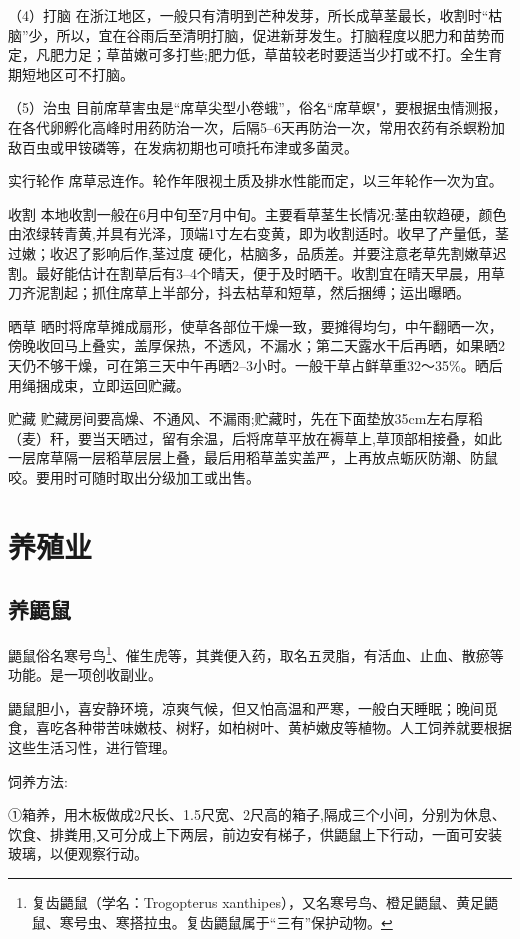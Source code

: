 \documentclass{ctexbook}
\begin{document}
（4）打脑 在浙江地区，一般只有清明到芒种发芽，所长成草茎最长，收割时“枯脑”少，所以，宜在谷雨后至清明打脑，促进新芽发生。打脑程度以肥力和苗势而定，凡肥力足；草苗嫩可多打些;肥力低，草苗较老时要适当少打或不打。全生育期短地区可不打脑。

（5）治虫 目前席草害虫是“席草尖型小卷蛾”，俗名“席草螟"，要根据虫情测报，在各代卵孵化高峰时用药防治一次，后隔5--6天再防治一次，常用农药有杀螟粉加敌百虫或甲铵磷等，在发病初期也可喷托布津或多菌灵。

实行轮作 席草忌连作。轮作年限视土质及排水性能而定，以三年轮作一次为宜。

收割 本地收割一般在6月中旬至7月中旬。主要看草茎生长情况:茎由软趋硬，颜色由浓绿转青黄,并具有光泽，顶端1寸左右变黄，即为收割适时。收早了产量低，茎过嫩；收迟了影响后作,茎过度
硬化，枯脑多，品质差。并要注意老草先割嫩草迟割。最好能估计在割草后有3--4个晴天，便于及时晒干。收割宜在晴天早晨，用草刀齐泥割起；抓住席草上半部分，抖去枯草和短草，然后捆缚；运出曝晒。

晒草 晒时将席草摊成扇形，使草各部位干燥一致，要摊得均匀，中午翻晒一次，傍晚收回马上叠实，盖厚保热，不透风，不漏水；第二天露水干后再晒，如果晒2天仍不够干燥，可在第三天中午再晒2--3小时。一般干草占鲜草重32〜35\%。晒后用绳捆成束，立即运回贮藏。

贮藏 贮藏房间要高燥、不通风、不漏雨;贮藏时，先在下面垫放35cm左右厚稻（麦）秆，要当天晒过，留有余温，后将席草平放在褥草上,草顶部相接叠，如此一层席草隔一层稻草层层上叠，最后用稻草盖实盖严，上再放点蛎灰防潮、防鼠咬。要用时可随时取出分级加工或出售。
\section{养殖业}
\subsection{养鼯鼠}
鼯鼠俗名寒号鸟\footnote{复齿鼯鼠（学名：Trogopterus xanthipes），又名寒号鸟、橙足鼯鼠、黄足鼯鼠、寒号虫、寒搭拉虫。复齿鼯鼠属于“三有”保护动物。}、催生虎等，其粪便入药，取名五灵脂，有活血、止血、散瘀等功能。是一项创收副业。

鼯鼠胆小，喜安静环境，凉爽气候，但又怕高温和严寒，一般白天睡眠；晚间觅食，喜吃各种带苦味嫩枝、树籽，如柏树叶、黄栌嫩皮等植物。人工饲养就要根据这些生活习性，进行管理。

饲养方法:

①箱养，用木板做成2尺长、1.5尺宽、2尺高的箱子,隔成三个小间，分别为休息、饮食、排粪用,又可分成上下两层，前边安有梯子，供鼯鼠上下行动，一面可安装玻璃，以便观察行动。
\end{document}
